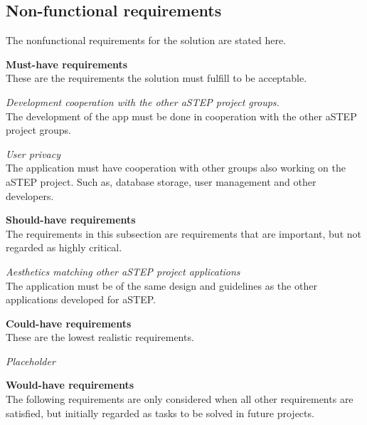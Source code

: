 \subsection{Non-functional requirements}
The nonfunctional requirements for the solution are stated here.

\textbf{Must-have requirements}\\
These are the requirements the solution must fulfill to be acceptable.

\textit{Development cooperation with the other aSTEP project groups.}\\
The development of the app must be done in cooperation with the other aSTEP project groups.

\textit{User privacy}\\
The application must have cooperation with other groups also working on the aSTEP project. Such as, database storage, user management and other developers.

\textbf{Should-have requirements}\\
The requirements in this subsection are requirements that are important, but not regarded as highly critical.

\textit{Aesthetics matching other aSTEP project applications}\\
The application must be of the same design and guidelines as the other applications developed for aSTEP.

\textbf{Could-have requirements}\\
These are the lowest realistic requirements. 

\textit{Placeholder}\\

\textbf{Would-have requirements}\\
The following requirements are only considered when all other requirements are satisfied, but initially regarded as tasks to be solved in future projects.

